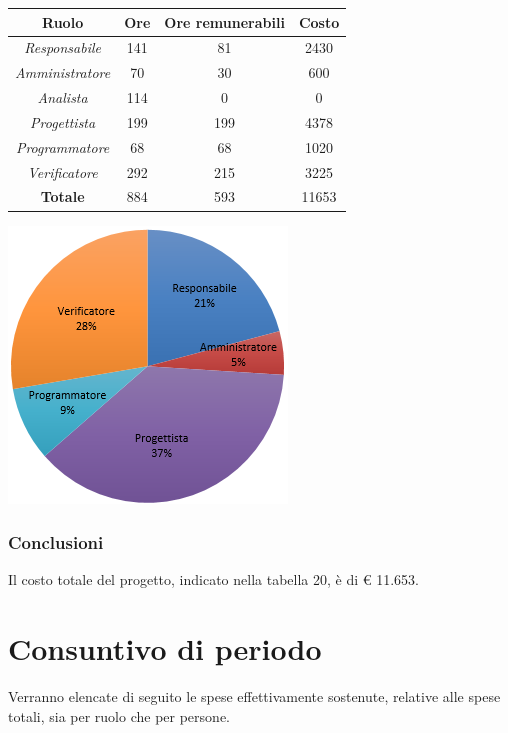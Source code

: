 \begin{center}
  \centering
  \begin{tabular}{|c|c|c|c|}
    \hline
    \textbf{Ruolo} & \textbf{Ore} & \textbf{Ore remunerabili} & \textbf{Costo} \\
    \hline  \emph{Responsabile}  & 141 & 81 & 2430 \\
    \hline  \emph{Amministratore}  & 70 & 30 & 600 \\
    \hline  \emph{Analista}  & 114 & 0 & 0 \\
    \hline  \emph{Progettista}  & 199 & 199 & 4378 \\
    \hline  \emph{Programmatore}  & 68 & 68 & 1020 \\
    \hline  \emph{Verificatore}  & 292 & 215 & 3225 \\
    \hline
    \textbf{Totale} & 884 & 593 & 11653 \\
    \hline
  \end{tabular}
  \includegraphics[scale=0.7]{img/7-Totale.png}
\end{center}

\subsubsection{Conclusioni}

Il costo totale del progetto, indicato nella tabella 20, è di € 11.653.

\section{Consuntivo di periodo}

Verranno elencate di seguito le spese effettivamente sostenute, relative alle spese totali, sia per ruolo che per persone.

